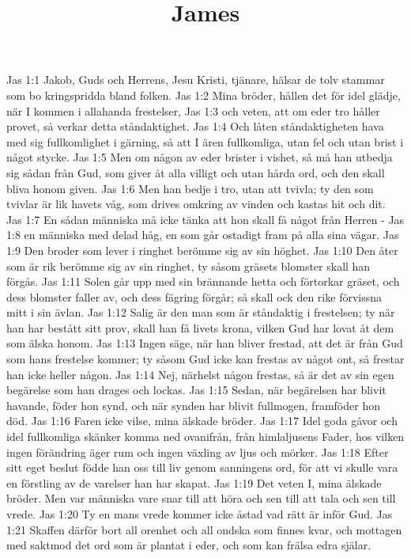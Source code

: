

\title{James}

Jas 1:1  Jakob, Guds och Herrens, Jesu Kristi, tjänare, hälsar de tolv stammar som bo kringspridda bland folken.
Jas 1:2  Mina bröder, hållen det för idel glädje, när I kommen i allahanda frestelser,
Jas 1:3  och veten, att om eder tro håller provet, så verkar detta ståndaktighet.
Jas 1:4  Och låten ståndaktigheten hava med sig fullkomlighet i gärning, så att I ären fullkomliga, utan fel och utan brist i något stycke.
Jas 1:5  Men om någon av eder brister i vishet, så må han utbedja sig sådan från Gud, som giver åt alla villigt och utan hårda ord, och den skall bliva honom given.
Jas 1:6  Men han bedje i tro, utan att tvivla; ty den som tvivlar är lik havets våg, som drives omkring av vinden och kastas hit och dit.
Jas 1:7  En sådan människa må icke tänka att hon skall få något från Herren -
Jas 1:8  en människa med delad håg, en som går ostadigt fram på alla sina vägar.
Jas 1:9  Den broder som lever i ringhet berömme sig av sin höghet.
Jas 1:10  Den åter som är rik berömme sig av sin ringhet, ty såsom gräsets blomster skall han förgås.
Jas 1:11  Solen går upp med sin brännande hetta och förtorkar gräset, och dess blomster faller av, och dess fägring förgår; så skall ock den rike förvissna mitt i sin ävlan.
Jas 1:12  Salig är den man som är ståndaktig i frestelsen; ty när han har bestått sitt prov, skall han få livets krona, vilken Gud har lovat åt dem som älska honom.
Jas 1:13  Ingen säge, när han bliver frestad, att det är från Gud som hans frestelse kommer; ty såsom Gud icke kan frestas av något ont, så frestar han icke heller någon.
Jas 1:14  Nej, närhelst någon frestas, så är det av sin egen begärelse som han drages och lockas.
Jas 1:15  Sedan, när begärelsen har blivit havande, föder hon synd, och när synden har blivit fullmogen, framföder hon död.
Jas 1:16  Faren icke vilse, mina älskade bröder.
Jas 1:17  Idel goda gåvor och idel fullkomliga skänker komma ned ovanifrån, från himlaljusens Fader, hos vilken ingen förändring äger rum och ingen växling av ljus och mörker.
Jas 1:18  Efter sitt eget beslut födde han oss till liv genom sanningens ord, för att vi skulle vara en förstling av de varelser han har skapat.
Jas 1:19  Det veten I, mina älskade bröder. Men var människa vare snar till att höra och sen till att tala och sen till vrede.
Jas 1:20  Ty en mans vrede kommer icke åstad vad rätt är inför Gud.
Jas 1:21  Skaffen därför bort all orenhet och all ondska som finnes kvar, och mottagen med saktmod det ord som är plantat i eder, och som kan frälsa edra själar.
